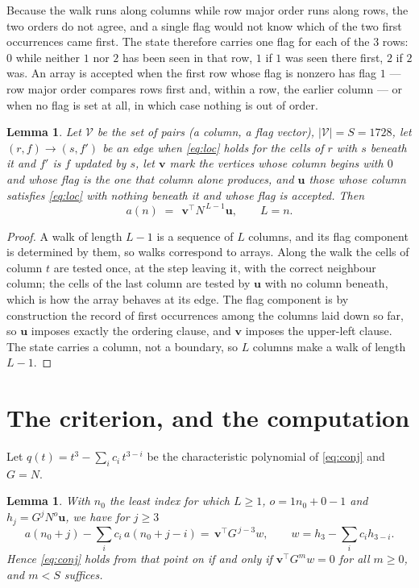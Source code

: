\documentclass[11pt,a4paper]{article}
\theoremstyle{plain}
\newtheorem{lemma}[theorem]{Lemma}
\theoremstyle{definition}
\begin{document}
Because the walk runs along columns while row major order runs along
rows, the two orders do not agree, and a single flag would not know which of the two
first occurrences came first. The state therefore carries one flag for each of the $3$
rows: $0$ while neither $1$ nor $2$ has been seen in that row, $1$ if $1$
was seen there first, $2$ if $2$ was. An array is accepted when the first row whose
flag is nonzero has flag $1$ --- row major order compares rows first and, within a
row, the earlier column --- or when no flag is set at all, in which case nothing is out of
order.

\begin{lemma}\label{lem:walk}
Let $\mathcal V$ be the set of pairs (a column, a flag vector), $|\mathcal V|=S=1728$, let
$(r,f)\to(s,f')$ be an edge when \eqref{eq:loc} holds for the cells of $r$ with $s$ beneath
it and $f'$ is $f$ updated by $s$, let $\mathbf{v}$ mark the vertices whose column begins
with $0$ and whose flag is the one that column alone produces, and $\mathbf{u}$ those whose
column satisfies \eqref{eq:loc} with nothing beneath it and whose flag is accepted. Then
\[
a(n)\;=\;\,\mathbf{v}^{\!\top}N^{\,L-1}\mathbf{u},\qquad L=n.
\]
\end{lemma}

\begin{proof}
A walk of length $L-1$ is a sequence of $L$ columns, and its flag component is determined by
them, so walks correspond to arrays. Along the walk the cells of column $t$ are tested once,
at the step leaving it, with the correct neighbour column; the cells of the last column are
tested by $\mathbf{u}$ with no column beneath, which is how the array behaves at its edge.
The flag component is by construction the record of first occurrences among the columns laid
down so far, so $\mathbf{u}$ imposes exactly the ordering clause, and $\mathbf{v}$ imposes
the upper-left clause. The state carries a column, not a boundary, so $L$ columns make a walk
of length $L-1$.
\end{proof}

\section{The criterion, and the computation}

Let $q(t)=t^{3}-\sum_i c_i\,t^{3-i}$ be the characteristic polynomial of
\eqref{eq:conj} and $G=N$.

\begin{lemma}\label{lem:crit}
With $n_0$ the least index for which $L\ge1$, $o=1n_0+0-1$ and
$h_j=G^{j}N^{o}\mathbf{u}$, we have for $j\ge3$
\[
a(n_0+j)-\sum_i c_i\,a(n_0+j-i)=\,\mathbf{v}^{\!\top}G^{\,j-3}w,
\qquad w=h_{3}-\sum_i c_ih_{3-i} .
\]
Hence \eqref{eq:conj} holds from that point on if and only if
$\mathbf{v}^{\!\top}G^{m}w=0$ for all $m\ge0$, and $m<S$ suffices.
\end{lemma}
\end{document}
